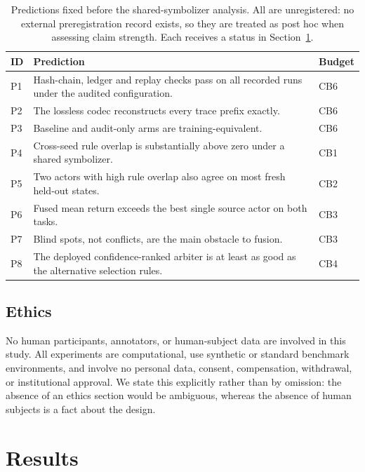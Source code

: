 \documentclass[11pt,a4paper]{article}
\begin{document}
\begin{table}[H]
\centering
\caption{Predictions fixed before the shared-symbolizer analysis. All are unregistered: no external preregistration record exists, so they are treated as post hoc when assessing claim strength. Each receives a status in Section~\ref{sec:results}.}
\label{tab:pred}
\small
\begin{tabularx}{\textwidth}{@{}l X l@{}}
\toprule
\textbf{ID} & \textbf{Prediction} & \textbf{Budget} \\
\midrule
P1 & Hash-chain, ledger and replay checks pass on all recorded runs under the audited configuration. & CB6 \\
P2 & The lossless codec reconstructs every trace prefix exactly. & CB6 \\
P3 & Baseline and audit-only arms are training-equivalent. & CB6 \\
P4 & Cross-seed rule overlap is substantially above zero under a shared symbolizer. & CB1 \\
P5 & Two actors with high rule overlap also agree on most fresh held-out states. & CB2 \\
P6 & Fused mean return exceeds the best single source actor on both tasks. & CB3 \\
P7 & Blind spots, not conflicts, are the main obstacle to fusion. & CB3 \\
P8 & The deployed confidence-ranked arbiter is at least as good as the alternative selection rules. & CB4 \\
\bottomrule
\end{tabularx}
\end{table}

\subsection{Ethics}

No human participants, annotators, or human-subject data are involved in this study. All experiments are computational, use synthetic or standard benchmark environments, and involve no personal data, consent, compensation, withdrawal, or institutional approval. We state this explicitly rather than by omission: the absence of an ethics section would be ambiguous, whereas the absence of human subjects is a fact about the design.

\section{Results}
\label{sec:results}
\end{document}
